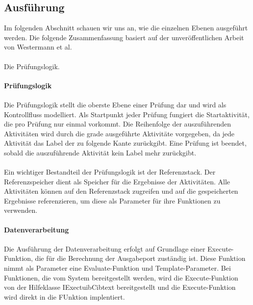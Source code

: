 \documentclass{article}
\begin{document}
    \subsection{Ausführung}
    Im folgenden Abschnitt schauen wir uns an, wie die einzelnen Ebenen ausgeführt werden.
    Die folgende Zusammenfassung basiert auf der unveröffentlichen Arbeit von Westermann et al.\\\\
    Die Prüfungslogik.\\
    \\
    \textbf{Prüfungslogik}\\
    \\
    Die Prüfungslogik stellt die oberste Ebene einer Prüfung dar und wird als Kontrollfluss modelliert.
    Als Startpunkt jeder Prüfung fungiert die Startaktivität, die pro Prüfung nur einmal vorkommt.
    Die Reihenfolge der auszuführenden Aktivitäten wird durch die grade ausgeführte Aktivitäte vorgegeben, da jede Aktivität das Label der zu folgende Kante zurückgibt.
    Eine Prüfung ist beendet, sobald die auszuführende Aktivität kein Label mehr zurückgibt.\\
    \\
    Ein wichtiger Bestandteil der Prüfungslogik ist der Referenzstack. Der Referenzspeicher dient als Speicher für die Ergebnisse der Aktivitäten.
    Alle Aktivitäten können auf den Referenzstack zugreifen und auf die gespeicherten Ergebnisse referenzieren, um diese als Parameter für ihre Funktionen zu verwenden.\\
    \\
    \textbf{Datenverarbeitung}\\
    \\

    Die Ausführung der Datenverarbeitung erfolgt auf Grundlage einer Execute-Funktion, die für die Berechnung der Ausgabeport zuständig ist.
    Diese Funktion nimmt als Parameter eine Evaluate-Funktion und Template-Parameter.
    Bei Funktionen, die vom System bereitgestellt werden, wird die Execute-Funktion von der Hilfeklasse IExectuibCibtext bereitgestellt und die Execute-Funktion wird direkt in die FUnktion implentiert.
\end{document}

